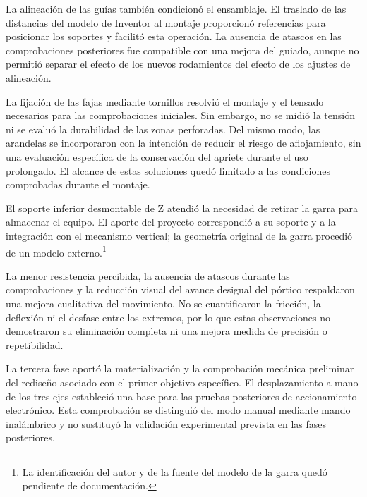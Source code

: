 La alineación de las guías también condicionó el ensamblaje. El traslado de las distancias del modelo de Inventor al montaje proporcionó referencias para posicionar los soportes y facilitó esta operación. La ausencia de atascos en las comprobaciones posteriores fue compatible con una mejora del guiado, aunque no permitió separar el efecto de los nuevos rodamientos del efecto de los ajustes de alineación.

La fijación de las fajas mediante tornillos resolvió el montaje y el tensado necesarios para las comprobaciones iniciales. Sin embargo, no se midió la tensión ni se evaluó la durabilidad de las zonas perforadas. Del mismo modo, las arandelas se incorporaron con la intención de reducir el riesgo de aflojamiento, sin una evaluación específica de la conservación del apriete durante el uso prolongado. El alcance de estas soluciones quedó limitado a las condiciones comprobadas durante el montaje.

El soporte inferior desmontable de Z atendió la necesidad de retirar la garra para almacenar el equipo. El aporte del proyecto correspondió a su soporte y a la integración con el mecanismo vertical; la geometría original de la garra procedió de un modelo externo.\footnote{La identificación del autor y de la fuente del modelo de la garra quedó pendiente de documentación.}

La menor resistencia percibida, la ausencia de atascos durante las comprobaciones y la reducción visual del avance desigual del pórtico respaldaron una mejora cualitativa del movimiento. No se cuantificaron la fricción, la deflexión ni el desfase entre los extremos, por lo que estas observaciones no demostraron su eliminación completa ni una mejora medida de precisión o repetibilidad.

La tercera fase aportó la materialización y la comprobación mecánica preliminar del rediseño asociado con el primer objetivo específico. El desplazamiento a mano de los tres ejes estableció una base para las pruebas posteriores de accionamiento electrónico. Esta comprobación se distinguió del modo manual mediante mando inalámbrico y no sustituyó la validación experimental prevista en las fases posteriores.

